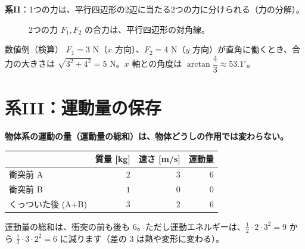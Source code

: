 \documentclass[a4paper,11pt,openany]{ltjsbook}
\begin{document}
\textbf{系II}：1つの力は、平行四辺形の2辺に当たる2つの力に分けられる（力の分解）。

\begin{figure}[htbp]
\centering
{}
\caption{2つの力 $F_1,F_2$ の合力は、平行四辺形の対角線。}
\end{figure}

\begin{examplebox}{数値例（検算）}
$F_1=3$ N（$x$ 方向）、$F_2=4$ N（$y$ 方向）が直角に働くとき、合力の大きさは $\sqrt{3^2+4^2}=5$ N。$x$ 軸との角度は $\arctan\dfrac43\approx53.1^\circ$。
\end{examplebox}

\section{系III：運動量の保存}

\textbf{物体系の運動の量（運動量の総和）は、物体どうしの作用では変わらない。}

\begin{center}
\begin{tabular}{lrrr}
\toprule
 & 質量 [kg] & 速さ [m/s] & 運動量\\
\midrule
衝突前 A & $2$ & $3$ & $6$\\
衝突前 B & $1$ & $0$ & $0$\\
\midrule
くっついた後 (A+B) & $3$ & $2$ & $6$\\
\bottomrule
\end{tabular}
\end{center}

運動量の総和は、衝突の前も後も $6$。ただし運動エネルギーは、$\frac12\cdot2\cdot3^2=9$ から $\frac12\cdot3\cdot2^2=6$ に減ります（差の $3$ は熱や変形に変わる）。
\end{document}
